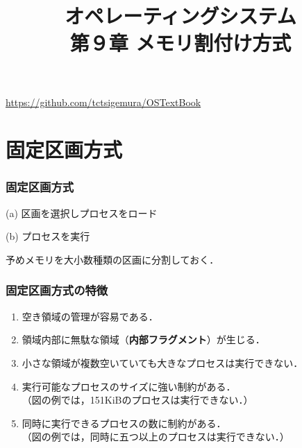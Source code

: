 \documentclass[unicode,handout]{beamer}                   %
\begin{document}
\title[メモリ割付け方式]
      {オペレーティングシステム\\第９章 メモリ割付け方式}
\date{}
\begin{frame}
  \titlepage
  \centerline{\url{https://github.com/tctsigemura/OSTextBook}}
\end{frame}


\section{固定区画方式}
\begin{frame}
  \frametitle{固定区画方式}
  \begin{minipage}{0.49\columnwidth}
    \centerline{(a) 区画を選択しプロセスをロード}
  \end{minipage}
  \begin{minipage}{0.49\columnwidth}
    \centerline{(b) プロセスを実行}
  \end{minipage}
  \vfill
  予めメモリを大小数種類の区画に分割しておく．
  \vfill
\end{frame}

\begin{frame}
  \frametitle{固定区画方式の特徴}
  \begin{enumerate}
  \item 空き領域の管理が容易である．
  \item 領域内部に無駄な領域（{\bf 内部フラグメント}）が生じる．
  \item 小さな領域が複数空いていても大きなプロセスは実行できない．
  \item 実行可能なプロセスのサイズに強い制約がある．\\
    （図の例では，151KiBのプロセスは実行できない．）
  \item 同時に実行できるプロセスの数に制約がある．\\
    （図の例では，同時に五つ以上のプロセスは実行できない．）
  \end{enumerate}
\end{frame}
\end{document}
